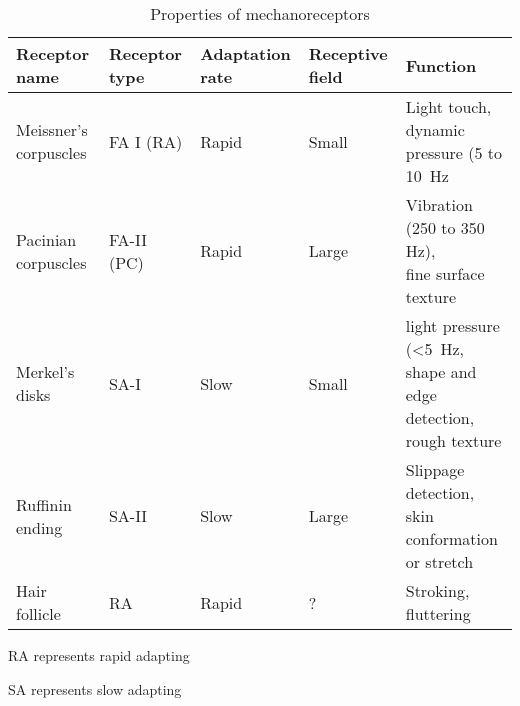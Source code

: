 \begin{table}[ht!]
\centering
\label{tab:mechanoreceptors}   
\begin{threeparttable}
\caption{Properties of mechanoreceptors} 
\begin{tabular}{| >{\centering\arraybackslash}m{1.8cm} | >{\centering\arraybackslash}m{2cm} | >{\centering\arraybackslash}m{1.8cm} |  >{\centering\arraybackslash}m{1.5cm} | >{\centering\arraybackslash}m{4.5 cm} |} 
\hline
\textbf{Receptor name}  &  \textbf{Receptor type}  &  \textbf{Adaptation rate}&  \textbf{Receptive field}   &  \textbf{Function}\\ 
 \hline
Meissner's corpuscles      & FA I (RA) &  Rapid & Small & \shortstack{Light touch, \\dynamic pressure (5 to \SI{10}{Hz}} \\
\hline
Pacinian corpuscles        & FA-II (PC) & Rapid & Large  & \shortstack{Vibration (250 to 350 Hz),\\ fine surface texture} \\
\hline
Merkel's disks                &SA-I  & Slow & Small & \shortstack{light pressure (<\SI{5}{Hz}, \\shape and edge detection, \\rough texture }    \\
\hline
Ruffinin ending             & SA-II & Slow & Large & \shortstack{Slippage detection, \\skin conformation or stretch}  \\                             
\hline
Hair follicle                   & RA   & Rapid &  ?    & Stroking, fluttering \\
\hline
\end{tabular}
    \begin{tablenotes}
      \small
      \item \qquad RA represents rapid adapting
      \item \qquad SA represents slow adapting
    \end{tablenotes}
  \end{threeparttable}
\end{table} 







